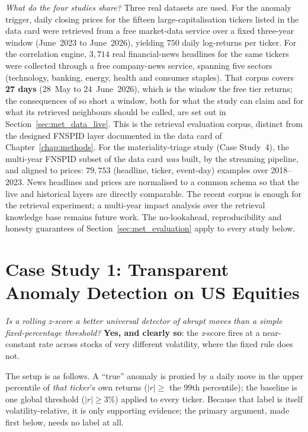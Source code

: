 \emph{What do the four studies share?} Three real datasets are used. For the anomaly trigger, daily closing prices for the fifteen
large-capitalisation tickers listed in the data card were retrieved from a free market-data service
over a fixed three-year window (June~2023 to June~2026), yielding $750$ daily log-returns per ticker. For the correlation engine,
$3{,}714$ real financial-news headlines for the same tickers were collected through a free company-news
service, spanning five sectors (technology, banking, energy, health and consumer staples). That corpus
covers \textbf{27 days} (28~May to 24~June~2026), which is the window the free tier returns; the
consequences of so short a window, both for what the study can claim and for what its retrieved
neighbours should be called, are set out in Section~\ref{sec:met_data_live}. This is the retrieval
evaluation corpus, distinct from the designed FNSPID layer documented in the data card of
Chapter~\ref{chap:methods}.
For the materiality-triage study (Case Study~4), the multi-year FNSPID subset of the data card
\emph{was} built, by the streaming pipeline, and aligned to prices: $79{,}753$ (headline, ticker,
event-day) examples over 2018--2023. News headlines and prices are normalised to a common
schema so that the live and historical layers are directly comparable. The recent corpus
is enough for the retrieval experiment; a multi-year impact analysis over the retrieval knowledge
base remains future work. The no-lookahead, reproducibility and honesty guarantees of
Section~\ref{sec:met_evaluation} apply to every study below.

\section{Case Study 1: Transparent Anomaly Detection on US Equities}
\label{sec:cs_anomaly}

\emph{Is a rolling \emph{z}-score a better universal detector of abrupt moves than a simple
fixed-percentage threshold?} \textbf{Yes, and clearly so}: the \emph{z}-score
\autocite{chandola2009anomaly} fires at a near-constant rate across stocks of very different volatility,
where the fixed rule does not.

The setup is as follows. A ``true'' anomaly is proxied by a daily move in the upper percentile of
\emph{that ticker}'s own returns ($|r|\ge$ the $99$th percentile); the baseline is one global threshold
($|r|\ge 3\%$) applied to every ticker. Because that label is itself volatility-relative, it is only
supporting evidence; the primary argument, made first below, needs no label at all.

